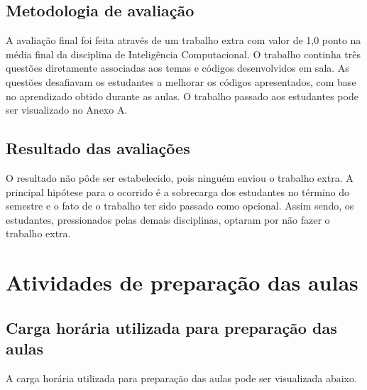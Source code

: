 \documentclass[
	12pt,				%
	openright,			%
	oneside,			%
	a4paper,			%
	chapter=TITLE,		%
	section=TITLE,		%
	english,			%
	french,				%
	spanish,			%
	brazil				%
	]{abntex2}
\begin{document}
\section{Metodologia de avaliação}

A avaliação final foi feita através de um trabalho extra com valor de 1,0 ponto na média final da disciplina de Inteligência Computacional.
O trabalho continha três questões diretamente associadas aos temas e códigos desenvolvidos em sala.
As questões desafiavam os estudantes a melhorar os códigos apresentados, com base no aprendizado obtido durante as aulas.
O trabalho passado aos estudantes pode ser visualizado no Anexo A.

\section{Resultado das avaliações}

O resultado não pôde ser estabelecido, pois ninguém enviou o trabalho extra.
A principal hipótese para o ocorrido é a sobrecarga dos estudantes no término do semestre e o fato de o trabalho ter sido passado como opcional.
Assim sendo, os estudantes, pressionados pelas demais disciplinas, optaram por não fazer o trabalho extra.

\newpage

\chapter{Atividades de preparação das aulas}

\vspace{-1cm}

\section{Carga horária utilizada para preparação das aulas}

A carga horária utilizada para preparação das aulas pode ser visualizada abaixo.
\end{document}
